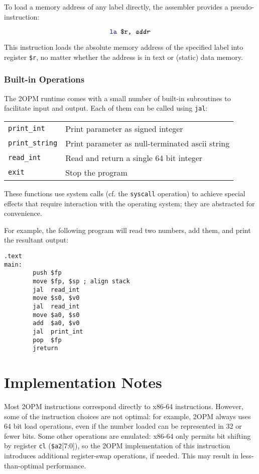 \documentclass{article}
\begin{document}
To load a memory address of any label directly, the assembler provides a pseudo-instruction:

\[
\texttt{\textcolor{dblue}{la} \texttt{\$r}, \texttt{\textit{addr}}}
\]

This instruction loads the absolute memory address of the specified label into register \texttt{\$r},
no matter whether the address is in text or (static) data memory.


\subsubsection{Built-in Operations}
The 2OPM runtime comes with a small number of built-in subroutines to facilitate
input and output.  Each of them can be called using
\texttt{\textcolor{dblue}{jal}}:

\begin{tabular}{ll}
\texttt{print\_int} & Print parameter as signed integer \\
\texttt{print\_string} & Print parameter as null-terminated ascii string \\
\texttt{read\_int} & Read and return a single 64 bit integer \\
\texttt{exit} & Stop the program \\
\end{tabular}

These functions use system calls (cf. the
\texttt{\textcolor{dblue}{syscall}} operation) to achieve special
effects that require interaction with the operating system; they are
abstracted for convenience.


For example, the following program will read two numbers, add them,
and print the resultant output:

\begin{lstlisting}
.text
main:
        push $fp
        move $fp, $sp ; align stack
        jal  read_int
        move $s0, $v0
        jal  read_int
        move $a0, $s0
        add  $a0, $v0
        jal  print_int
        pop  $fp
        jreturn
\end{lstlisting}


\section{Implementation Notes}

Most 2OPM instructions correspond directly to x86-64 instructions.
However, some of the instruction choices are not optimal: for example,
2OPM always uses 64 bit load operations, even if the number loaded can
be represented in 32 or fewer bits.  Some other operations are
emulated: x86-64 only permits bit shifting by register \texttt{cl}
(\texttt{\$a2}[7:0]), so the 2OPM implementation of this instruction
introduces additional register-swap operations, if needed.  This may
result in less-than-optimal performance.
\end{document}
